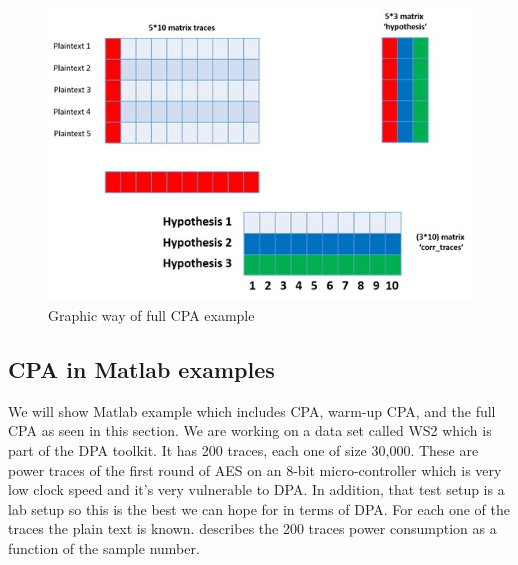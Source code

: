 \begin{figure}[!ht]
    \centering
    \includegraphics[width=1.0\textwidth]{images/chapter8/cpa_example.jpg}
    \caption{Graphic way of full CPA example} \label{c8_cpa_example:fig}
\end{figure}

\subsection{CPA in Matlab examples}\label{c6_Matlab_CPA_example:subsec}

We will show Matlab example which includes CPA, warm-up CPA, and the full CPA as
seen in this section. We are working on a data set called WS2 \cite{WS2} which is part of
the DPA toolkit. It has 200 traces, each one of size 30,000. These are power
traces of the first round of AES on an 8-bit micro-controller which is very low
clock speed and it's very vulnerable to DPA. In addition, that test setup is a
lab setup so this is the best we can hope for in terms of DPA. For each one of
the traces the plain text is known. 
describes the 200 traces power consumption as a function of the sample number. 

